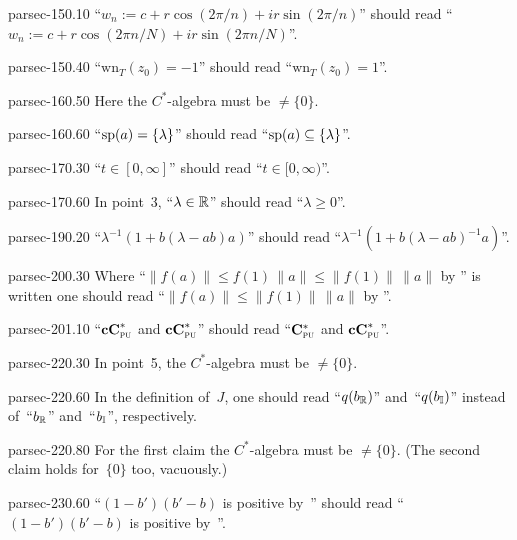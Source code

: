 \documentclass[b5page]{book}
\begin{document}
\begin{erratum}{parsec-150.10}
``$w_n := c+r\cos(2\pi/n)+ir\sin(2\pi/n)$''
should read
``$w_n := c+r\cos(2\pi n/N)+ir\sin(2\pi n/N)$''.
\end{erratum}
\begin{erratum}{parsec-150.40}
``$\mathrm{wn}_T(z_0)=-1$'' should read ``$\mathrm{wn}_T(z_0)=1$''.
\end{erratum}
\begin{erratum}{parsec-160.50}
Here the $C^*$-algebra must be $\neq \{0\}$.
\end{erratum}
\begin{erratum}{parsec-160.60}
``$\mathrm{sp}(a)=\{\lambda\}$'' should read ``$\mathrm{sp}(a)\subseteq\{\lambda\}$''.
\end{erratum}
\begin{erratum}{parsec-170.30}
``$t\in [0,\infty]$''
should read
``$t\in [0,\infty)$''.
\end{erratum}
\begin{erratum}{parsec-170.60}
In point~3,
``$\lambda \in \mathbb{R}$'' should read ``$\lambda \geq 0$''.
\end{erratum}
\begin{erratum}{parsec-190.20}
``$\lambda^{-1}(1+b(\lambda-ab)a)$''
should read
``$\lambda^{-1}(1+b(\lambda-ab)^{-1}a)$''.
\end{erratum}
\begin{erratum}{parsec-200.30}
Where  ``$\|f(a)\|\leq f(1)\,\|a\|\leq\|f(1)\|\,\|a\|$
    by ''
is written
one should read
``$\|f(a)\|\leq\|f(1)\|\,\|a\|$ by ''.
\end{erratum}
\begin{erratum}{parsec-201.10}%
``$\mathbf{cC}^*_{\text{\textsc{pu}}}$ and $\mathbf{cC}^*_{\text{\textsc{pu}}}$''
should read
``$\mathbf{C}^*_{\text{\textsc{pu}}}$ and $\mathbf{cC}^*_{\text{\textsc{pu}}}$''.
\end{erratum}
\begin{erratum}{parsec-220.30}
In point~5, the $C^*$-algebra must be $\neq\{0\}$.
\end{erratum}
\begin{erratum}{parsec-220.60}
In the definition of~$J$,
one should read ``$q(b_{\mathbb{R}})$''
and~``$q(b_{\mathbb{I}})$''
instead of~``$b_{\mathbb{R}}$''
and~``$b_{\mathbb{I}}$'', respectively.
\end{erratum}
\begin{erratum}{parsec-220.80}
For the first claim the $C^*$-algebra must be $\neq\{0\}$.
(The second claim holds for~$\{0\}$ too, vacuously.)
\end{erratum}
\begin{erratum}{parsec-230.60}
``$(1-b')(b'-b)$ is positive by~''
should read
``$(1-b')(b'-b)$ is positive by~''.
\end{erratum}
\end{document}
